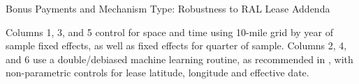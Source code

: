 \documentclass[12pt]{article}
\begin{document}
\begin{appendices}
\begin{table}[H]
\begin{center}
\begin{threeparttable}
	\caption{Bonus Payments and Mechanism Type: Robustness to RAL Lease Addenda}
	\label{tab:table_bonus_addenda}
 	\small
   	            
    \footnotesize
    \begin{tablenotes}
    	\item Columns 1, 3, and 5 control for space and time using 10-mile grid by year of sample fixed effects, as well as fixed effects for quarter of sample.  Columns 2, 4, and 6 use a double/debiased machine learning routine, as recommended in \cite{chernozhukov2018double}, with non-parametric controls for lease latitude, longitude and effective date.  
    \end{tablenotes}
\end{threeparttable}
\end{center}
\end{table}

\end{appendices}
\end{document}
